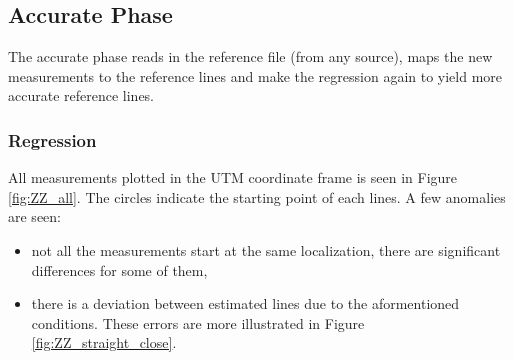 \documentclass[sn-mathphys-num]{sn-jnl}%
\begin{document}
\subsection{Accurate Phase}
The accurate phase reads in the reference file (from any source), maps the new measurements to the reference lines and make the regression again to yield more accurate 
reference lines.
\newline \newline
{}

\subsubsection{Regression}
All measurements plotted in the UTM coordinate frame is seen in Figure \ref{fig:ZZ_all}. The circles indicate the starting point of each lines. A few anomalies
are seen:
\begin{itemize}
    \item not all the measurements start at the same localization, there are significant differences for some of them,
    \item there is a deviation between estimated lines due to the aformentioned conditions. These errors are more illustrated in Figure \ref{fig:ZZ_straight_close}.
\end{itemize}
\end{document}
